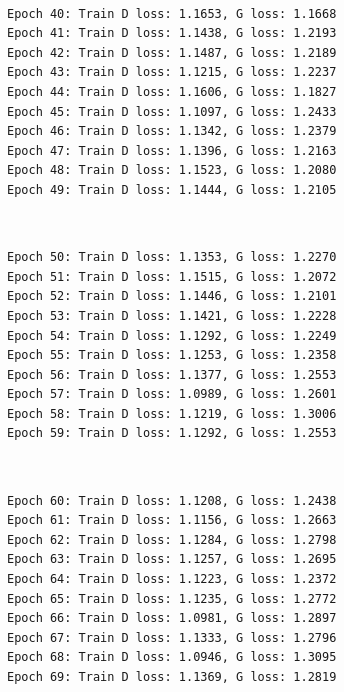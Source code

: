 \documentclass[11pt]{article}
\begin{document}
    \begin{center}
    \end{center}
    { \hspace*{\fill} \\}
    
    \begin{Verbatim}[commandchars=\\\{\}]
Epoch 40: Train D loss: 1.1653, G loss: 1.1668
Epoch 41: Train D loss: 1.1438, G loss: 1.2193
Epoch 42: Train D loss: 1.1487, G loss: 1.2189
Epoch 43: Train D loss: 1.1215, G loss: 1.2237
Epoch 44: Train D loss: 1.1606, G loss: 1.1827
Epoch 45: Train D loss: 1.1097, G loss: 1.2433
Epoch 46: Train D loss: 1.1342, G loss: 1.2379
Epoch 47: Train D loss: 1.1396, G loss: 1.2163
Epoch 48: Train D loss: 1.1523, G loss: 1.2080
Epoch 49: Train D loss: 1.1444, G loss: 1.2105

    \end{Verbatim}

    \begin{center}
    \end{center}
    { \hspace*{\fill} \\}
    
    \begin{Verbatim}[commandchars=\\\{\}]
Epoch 50: Train D loss: 1.1353, G loss: 1.2270
Epoch 51: Train D loss: 1.1515, G loss: 1.2072
Epoch 52: Train D loss: 1.1446, G loss: 1.2101
Epoch 53: Train D loss: 1.1421, G loss: 1.2228
Epoch 54: Train D loss: 1.1292, G loss: 1.2249
Epoch 55: Train D loss: 1.1253, G loss: 1.2358
Epoch 56: Train D loss: 1.1377, G loss: 1.2553
Epoch 57: Train D loss: 1.0989, G loss: 1.2601
Epoch 58: Train D loss: 1.1219, G loss: 1.3006
Epoch 59: Train D loss: 1.1292, G loss: 1.2553

    \end{Verbatim}

    \begin{center}
    \end{center}
    { \hspace*{\fill} \\}
    
    \begin{Verbatim}[commandchars=\\\{\}]
Epoch 60: Train D loss: 1.1208, G loss: 1.2438
Epoch 61: Train D loss: 1.1156, G loss: 1.2663
Epoch 62: Train D loss: 1.1284, G loss: 1.2798
Epoch 63: Train D loss: 1.1257, G loss: 1.2695
Epoch 64: Train D loss: 1.1223, G loss: 1.2372
Epoch 65: Train D loss: 1.1235, G loss: 1.2772
Epoch 66: Train D loss: 1.0981, G loss: 1.2897
Epoch 67: Train D loss: 1.1333, G loss: 1.2796
Epoch 68: Train D loss: 1.0946, G loss: 1.3095
Epoch 69: Train D loss: 1.1369, G loss: 1.2819

    \end{Verbatim}
\end{document}
